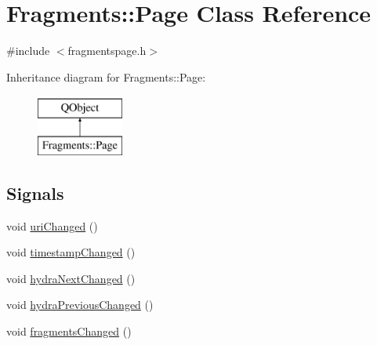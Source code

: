 \hypertarget{classFragments_1_1Page}{}\section{Fragments\+:\+:Page Class Reference}
\label{classFragments_1_1Page}


{\ttfamily \#include $<$fragmentspage.\+h$>$}

Inheritance diagram for Fragments\+:\+:Page\+:\begin{figure}[H]
\begin{center}
\leavevmode
\includegraphics[height=2.000000cm]{classFragments_1_1Page}
\end{center}
\end{figure}
\subsection*{Signals}
\begin{DoxyCompactItemize}
\item 
void \mbox{\hyperlink{classFragments_1_1Page_a03f40d5c9520331432c9f1c7ab9f805c}{uri\+Changed}} ()
\item 
void \mbox{\hyperlink{classFragments_1_1Page_acfdd19abc8342361f975b4d9d10e2e64}{timestamp\+Changed}} ()
\item 
void \mbox{\hyperlink{classFragments_1_1Page_a0b56ee63d18b43654cdfebd6a39c8d4f}{hydra\+Next\+Changed}} ()
\item 
void \mbox{\hyperlink{classFragments_1_1Page_a6f63a3428523cfa79ab30bfce32c0509}{hydra\+Previous\+Changed}} ()
\item 
void \mbox{\hyperlink{classFragments_1_1Page_a6d449124d048af31d3e1e24a66c34636}{fragments\+Changed}} ()
\end{DoxyCompactItemize}
